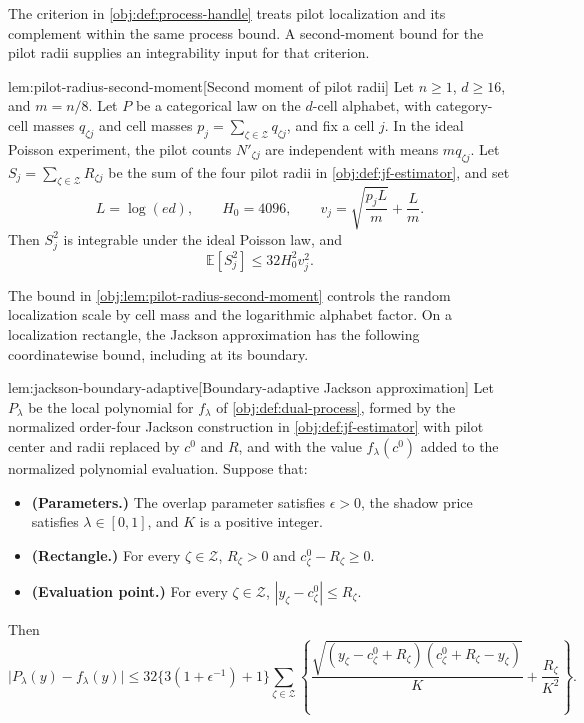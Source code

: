 The criterion in \cref{obj:def:process-handle} treats pilot localization and its complement within the same process bound. A second-moment bound for the pilot radii supplies an integrability input for that criterion.

\begin{lemmav}{lem:pilot-radius-second-moment}[Second moment of pilot radii]
Let \(n\geq 1\), \(d\geq 16\), and \(m=n/8\). Let \(P\) be a categorical law on the \(d\)-cell alphabet, with category-cell masses \(q_{\zeta j}\) and cell masses \(p_j=\sum_{\zeta\in\mathcal Z}q_{\zeta j}\), and fix a cell \(j\). In the ideal Poisson experiment, the pilot counts \(N'_{\zeta j}\) are independent with means \(m q_{\zeta j}\). Let \(S_j=\sum_{\zeta\in\mathcal Z}R_{\zeta j}\) be the sum of the four pilot radii in \cref{obj:def:jf-estimator}, and set
\[
L=\log(ed),\qquad H_0=4096,\qquad
v_j=\sqrt{\frac{p_jL}{m}}+\frac{L}{m}.
\]
Then \(S_j^2\) is integrable under the ideal Poisson law, and
\[
\mathbb E[S_j^2]\leq 32H_0^2v_j^2.
\]
\end{lemmav}

The bound in \cref{obj:lem:pilot-radius-second-moment} controls the random localization scale by cell mass and the logarithmic alphabet factor. On a localization rectangle, the Jackson approximation has the following coordinatewise bound, including at its boundary.

\begin{lemmav}{lem:jackson-boundary-adaptive}[Boundary-adaptive Jackson approximation]
Let \(P_\lambda\) be the local polynomial for \(f_\lambda\) of \cref{obj:def:dual-process}, formed by the normalized order-four Jackson construction in \cref{obj:def:jf-estimator} with pilot center and radii replaced by \(c^0\) and \(R\), and with the value \(f_\lambda(c^0)\) added to the normalized polynomial evaluation. Suppose that:
\begin{itemize}
\item \textbf{(Parameters.)} The overlap parameter satisfies \(\epsilon>0\), the shadow price satisfies \(\lambda\in[0,1]\), and \(K\) is a positive integer.
\item \textbf{(Rectangle.)} For every \(\zeta\in\mathcal Z\), \(R_\zeta>0\) and \(c^0_\zeta-R_\zeta\geq0\).
\item \textbf{(Evaluation point.)} For every \(\zeta\in\mathcal Z\), \(|y_\zeta-c^0_\zeta|\leq R_\zeta\).
\end{itemize}
Then
\[
\bigl|P_\lambda(y)-f_\lambda(y)\bigr|
\leq
32\bigl\{3(1+\epsilon^{-1})+1\bigr\}
\sum_{\zeta\in\mathcal Z}
\left\{
\frac{\sqrt{(y_\zeta-c^0_\zeta+R_\zeta)(c^0_\zeta+R_\zeta-y_\zeta)}}{K}
+\frac{R_\zeta}{K^2}
\right\}.
\]
\end{lemmav}

